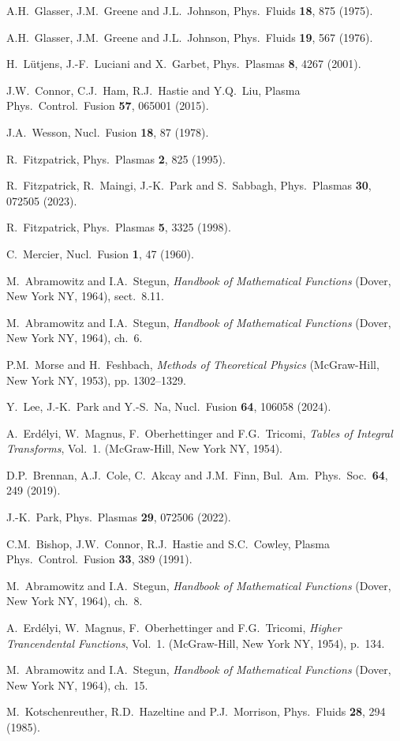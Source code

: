 \documentclass[12pt,prb,aps]{revtex4-1}
\providecommand{\DIFaddend}{} %
\DeclareRobustCommand{\DIFaddend}{\DIFOaddend \let\includegraphics\DIFOincludegraphics} %
\begin{document}
\begin{thebibliography}{99}
\DIFaddend {} A.H.~Glasser, J.M.~Greene and J.L.~Johnson, Phys.\ Fluids {\bf 18}, 875 (1975).

 A.H.~Glasser, J.M.~Greene  and J.L.~Johnson, Phys.\ Fluids {\bf 19}, 567 (1976).

 H.~L\"{u}tjens, J.-F.~Luciani and X.~Garbet, Phys.\ Plasmas {\bf 8}, 4267 (2001).

 J.W.~Connor, C.J.~Ham, R.J.~Hastie and Y.Q.~Liu, Plasma Phys.\ Control.\ Fusion {\bf 57}, 065001 (2015). 

 J.A.~Wesson, Nucl.\ Fusion {\bf 18},  87 (1978).

 R.~Fitzpatrick, Phys.\ Plasmas {\bf 2}, 825 (1995).

 R.~Fitzpatrick, R.~Maingi, J.-K.~Park and S.~Sabbagh, Phys.\ Plasmas {\bf 30}, 072505 (2023).

 R.~Fitzpatrick, Phys.\ Plasmas {\bf 5}, 3325 (1998).

 C.~Mercier, Nucl.\ Fusion {\bf 1}, 47 (1960).

 M.~Abramowitz and I.A.~Stegun, {\em Handbook of Mathematical Functions}\/ (Dover, New York NY, 1964), sect.~8.11.

 M.~Abramowitz and I.A.~Stegun, {\em Handbook of Mathematical Functions}\/ (Dover, New York NY, 1964), ch.~6.

 P.M.~Morse and H.~Feshbach, {\em Methods of Theoretical Physics}\/ (McGraw-Hill, New York NY, 1953), pp. 1302–1329.

 Y.~Lee, J.-K.~Park and Y.-S.~Na, Nucl.\ Fusion {\bf 64}, 106058 (2024). 

 A.~Erd\'{e}lyi, W.~Magnus, F.~Oberhettinger and F.G.~Tricomi, {\em Tables of Integral Transforms}, Vol.~1. (McGraw-Hill, New York NY, 1954).

 D.P.~Brennan, A.J.~Cole, C.~Akcay and J.M.~Finn, Bul.\ Am.\ Phys.\ Soc.\ {\bf 64}, 249 (2019).

 J.-K.~Park, Phys.\ Plasmas {\bf 29}, 072506 (2022).

 C.M.~Bishop, J.W.~Connor, R.J.~Hastie and S.C.~Cowley, Plasma Phys.\ Control.\ Fusion {\bf 33}, 389 (1991). 

 M.~Abramowitz and I.A.~Stegun, {\em Handbook of Mathematical Functions}\/ (Dover, New York NY, 1964), ch.~8.

 A.~Erd\'{e}lyi, W.~Magnus, F.~Oberhettinger and F.G.~Tricomi, {\em Higher Trancendental Functions}, Vol.~1. (McGraw-Hill, New York NY, 1954), p.~134.

 M.~Abramowitz and I.A.~Stegun, {\em Handbook of Mathematical Functions}\/ (Dover, New York NY, 1964), ch.~15.

 M.~Kotschenreuther, R.D.~Hazeltine and P.J.~Morrison, Phys.\ Fluids {\bf 28}, 294 (1985). 

\end{thebibliography}
\end{document}
